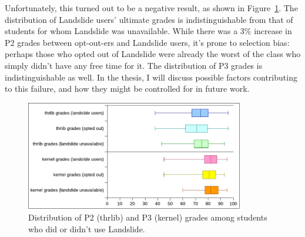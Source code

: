 Unfortunately, this turned out to be a negative result, as shown in Figure~\ref{fig:grade-distribution}.
The distribution of Landslide users' ultimate grades is indistinguishable from that of students for whom Landslide was unavailable.
While there was a 3\% increase in P2 grades between opt-out-ers and Landslide users, it's prone to selection bias:
perhaps those who opted out of Landslide were already the worst of the class who simply didn't have any free time for it.
The distribution of P3 grades is indistinguishable as well.
In the thesis, I will discuss possible factors contributing to this failure, and how they might be controlled for in future work.

\begin{figure}[h]
	\begin{center}
	\includegraphics[width=0.85\textwidth]{p2-p3-distribution.pdf}
	\end{center}
	\caption{Distribution of P2 (thrlib) and P3 (kernel) grades among students who did or didn't use Landslide.}
	\label{fig:grade-distribution}
\end{figure}


